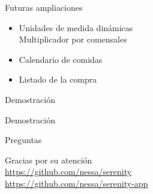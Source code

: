 \documentclass[10pt,xcolor=svgnames]{beamer}
\begin{document}
\begin{frame}{Futuras ampliaciones}

  \begin{itemize}
  \item Unidades de medida dinámicas\\
    \then{} Multiplicador por comensales

    \vspace*{0.5cm}
  \item Calendario de comidas

    \vspace*{0.5cm}
  \item Listado de la compra
  \end{itemize}
\end{frame}


\begin{frame}{Demostración}

  \begin{center}
    \Huge Demostración
  \end{center}
\end{frame}  


\begin{frame}{Preguntas}

  \begin{center}
    \Large Gracias por su atención\\
    \vspace*{1cm}
    \large \url{https://github.com/nessa/serenity}\\
    \large \url{https://github.com/nessa/serenity-app}
  \end{center}
\end{frame}  

\licencia
\end{document}
